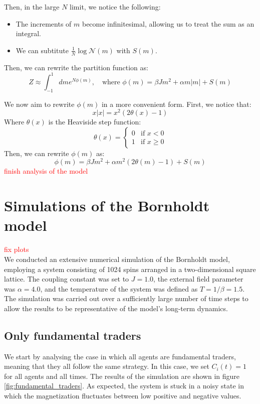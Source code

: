Then, in the large $N$ limit, we notice the following:
\begin{itemize}
    \item The increments of $m$ become infinitesimal, allowing us to treat the sum as an integral.
    \item We can subtitute $\frac{1}{N}\log\mathcal{N}(m)$ with $S(m)$.
\end{itemize}
Then, we can rewrite the partition function as:
\begin{equation}
    Z \approx \int_{-1}^{1} dm e^{N\phi(m)}, \quad \text{where }
    \phi(m) = \beta J m^2 + \alpha m |m| + S(m)
\end{equation}

We now aim to rewrite $\phi(m)$ in a more convenient form. First, we notice that:
\begin{equation}
    x|x| = x^2 (2\theta(x)-1)
\end{equation}
Where $\theta(x)$ is the Heaviside step function:
\begin{equation}
    \theta(x) = \begin{cases}
        0 & \text{if } x < 0\\
        1 & \text{if } x \geq 0
    \end{cases}
\end{equation}
Then, we can rewrite $\phi(m)$ as:
\begin{equation}
    \phi(m) = \beta J m^2 + \alpha m^2 (2\theta(m)-1) + S(m)
\end{equation}
\textcolor{red}{finish analysis of the model}

\section{Simulations of the Bornholdt model}
\textcolor{red}{fix plots}\\
We conducted an extensive numerical simulation of the Bornholdt model, employing a system consisting of 1024 spins arranged in a two-dimensional square lattice. The coupling constant was set to $J=1.0$, the external field parameter was $\alpha=4.0$, and the temperature of the system was defined as $T=1/\beta=1.5$. The simulation was carried out over a sufficiently large number of time steps to allow the results to be representative of the model's long-term dynamics.

\subsection{Only fundamental traders}
We start by analysing the case in which all agents are fundamental traders, meaning that they all follow the same strategy. In this case, we set $C_i(t) = 1$ for all agents and all times. The results of the simulation are shown in figure \ref{fig:fundamental_traders}. As expected, the system is stuck in a noisy state in which the magnetization fluctuates between low positive and negative values.

